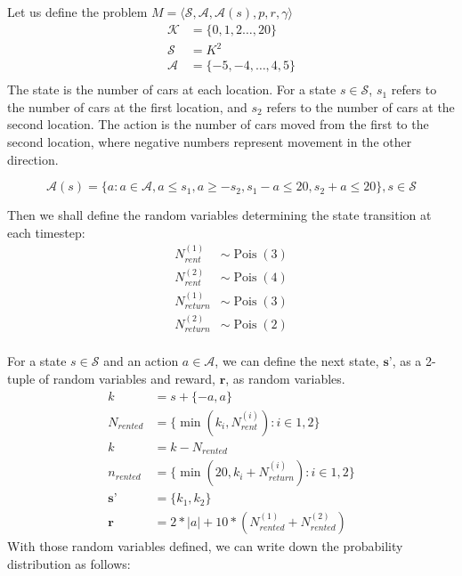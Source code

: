 \documentclass[addpoints,12pt,solution]{exam}
\begin{document}
\begin{questions}
\begin{enumerate}[label=(\alph*)]
            \begin{solution}
                Let us define the problem $M = \langle \mathcal{S}, \mathcal{A}, \mathcal{A}(s), p, r, \gamma \rangle$
                \begin{align*}
                    \mathcal{K} &= \{ 0, 1, 2 \dots , 20\} \\
                    \mathcal{S} &= K^2 \\
                    \mathcal{A} &= \{-5, -4, \dots, 4, 5\} \\
                \end{align*}
                The state is the number of cars at each location. For a state $s \in \mathcal{S}$,
                $s_1$ refers to the number of cars at the first location,
                and $s_2$ refers to the number of cars at the second location.
                The action is the number of cars moved from the first to the second location,
                where negative numbers represent movement in the other direction.

                \[
                    \mathcal{A}(s) = \{a : a \in \mathcal{A}, a \leq s_1, a \geq -s_2, s_1 - a \leq 20, s_2 + a \leq 20\}, s \in \mathcal{S}
                \]

                Then we shall define the random variables determining the state transition at each timestep:
                \begin{align*}
                    N_{rent}^{(1)} &\sim \operatorname{Pois}(3) \\
                    N_{rent}^{(2)} &\sim \operatorname{Pois}(4) \\
                    N_{return}^{(1)} &\sim \operatorname{Pois}(3) \\
                    N_{return}^{(2)} &\sim \operatorname{Pois}(2) \\
                \end{align*}

                For a state $s \in \mathcal{S}$ and an action $a \in \mathcal{A}$, we can define the next state, $\textbf{s'}$,
                as a 2-tuple of random variables and reward, $\textbf{r}$, as random variables.
                \begin{align*}
                    k &= s + \{-a, a\} \\
                    N_{rented} &= \{\min{(k_i, N_{rent}^{(i)})} : i \in {1,2} \} \\
                    k &= k - N_{rented} \\
                    n_{rented} &= \{\min{(20, k_i + N_{return}^{(i)})} : i \in {1,2} \} \\
                    \textbf{s'} &= \{k_1, k_2\}\\
                    \textbf{r} &= 2 * |a| + 10 *( N_{rented}^{(1)} + N_{rented}^{(2)})
                \end{align*}
                With those random variables defined, we can write down the probability distribution as follows:


\end{solution}
\end{enumerate}
\end{questions}
\end{document}
